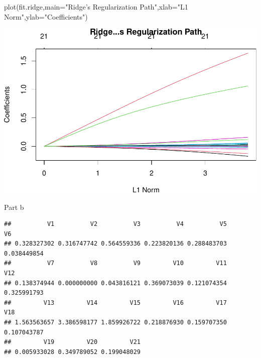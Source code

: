 \documentclass[
]{article}
\newenvironment{Shaded}{\begin{snugshade}}{\end{snugshade}}
\newcommand{\AttributeTok}[1]{\textcolor[rgb]{0.77,0.63,0.00}{#1}}
\newcommand{\CommentTok}[1]{\textcolor[rgb]{0.56,0.35,0.01}{\textit{#1}}}
\newcommand{\DecValTok}[1]{\textcolor[rgb]{0.00,0.00,0.81}{#1}}
\newcommand{\FunctionTok}[1]{\textcolor[rgb]{0.00,0.00,0.00}{#1}}
\newcommand{\NormalTok}[1]{#1}
\newcommand{\OtherTok}[1]{\textcolor[rgb]{0.56,0.35,0.01}{#1}}
\newcommand{\SpecialCharTok}[1]{\textcolor[rgb]{0.00,0.00,0.00}{#1}}
\newcommand{\StringTok}[1]{\textcolor[rgb]{0.31,0.60,0.02}{#1}}
\begin{document}
\begin{Shaded}
\begin{Highlighting}[]
\FunctionTok{plot}\NormalTok{(fit.ridge,}\AttributeTok{main=}\StringTok{"Ridge’s Regularization Path"}\NormalTok{,}\AttributeTok{xlab=}\StringTok{"L1 Norm"}\NormalTok{,}\AttributeTok{ylab=}\StringTok{"Coefficients"}\NormalTok{)}
\end{Highlighting}
\end{Shaded}

\includegraphics{HW3_Wu-Yulun_files/figure-latex/unnamed-chunk-2-2.pdf}

Part b

\begin{Shaded}
\end{Shaded}

\begin{verbatim}
##          V1          V2          V3          V4          V5          V6 
## 0.328327302 0.316747742 0.564559336 0.223820136 0.288483703 0.038449854 
##          V7          V8          V9         V10         V11         V12 
## 0.138374944 0.000000000 0.043816121 0.369073039 0.121074354 0.325991793 
##         V13         V14         V15         V16         V17         V18 
## 1.563563657 3.386598177 1.859926722 0.218876930 0.159707350 0.107043787 
##         V19         V20         V21 
## 0.005933028 0.349789052 0.199048029
\end{verbatim}
\end{document}
